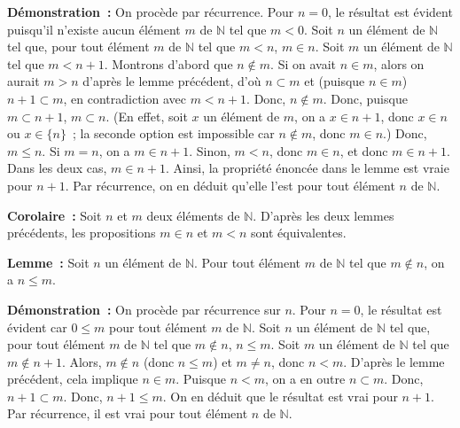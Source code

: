 \noindent\textbf{Démonstration :} 
    On procède par récurrence. 
    Pour $n=0$, le résultat est évident puisqu'il n'existe aucun élément $m$ de $\mathbb{N}$ tel que $m < 0$.
    Soit $n$ un élément de $\mathbb{N}$ tel que, pour tout élément $m$ de $\mathbb{N}$ tel que $m < n$, $m \in n$. 
    Soit $m$ un élément de $\mathbb{N}$ tel que $m < n+1$. 
    Montrons d'abord que $n \notin m$. 
    Si on avait $n \in m$, alors on aurait $m > n$ d'après le lemme précédent, d'où $n \subset m$ et (puisque $n \in m$) $n+1 \subset m$, en contradiction avec $m < n+1$. 
    Donc, $n \notin m$. 
    Donc, puisque $m \subset n+1$, $m \subset n$. 
    (En effet, soit $x$ un élément de $m$, on a $x \in n+1$, donc $x \in n$ ou $x \in \lbrace n \rbrace$ ; la seconde option est impossible car $n \notin m$, donc $m \in n$.)
    Donc, $m \leq n$. 
    Si $m = n$, on a $m \in n+1$. 
    Sinon, $m < n$, donc $m \in n$, et donc $m \in n+1$. 
    Dans les deux cas, $m \in n+1$. 
    Ainsi, la propriété énoncée dans le lemme est vraie pour $n+1$. 
    Par récurrence, on en déduit qu'elle l'est pour tout élément $n$ de $\mathbb{N}$.

   \done 

\medskip

\noindent\textbf{Corolaire :} 
    Soit $n$ et $m$ deux éléments de $\mathbb{N}$. 
    D'après les deux lemmes précédents, les propositions $m \in n$ et $m < n$ sont équivalentes.

\medskip

\noindent\textbf{Lemme :} 
    Soit $n$ un élément de $\mathbb{N}$. 
    Pour tout élément $m$ de $\mathbb{N}$ tel que $m \notin n$, on a $n \leq m$.

\medskip

\noindent\textbf{Démonstration :} 
    On procède par récurrence sur $n$. 
    Pour $n=0$, le résultat est évident car $0 \leq m$ pour tout élément $m$ de $\mathbb{N}$.
    Soit $n$ un élément de $\mathbb{N}$ tel que, pour tout élément $m$ de $\mathbb{N}$ tel que $m \notin n$, $n \leq m$. 
    Soit $m$ un élément de $\mathbb{N}$ tel que $m \notin n+1$. 
    Alors, $m \notin n$ (donc $n \leq m$) et $m \neq n$, donc $n < m$. 
    D'après le lemme précédent, cela implique $n \in m$. 
    Puisque $n < m$, on a en outre $n \subset m$. 
    Donc, $n+1 \subset m$. 
    Donc, $n+1 \leq m$. 
    On en déduit que le résultat est vrai pour $n+1$.
    Par récurrence, il est vrai pour tout élément $n$ de $\mathbb{N}$. 

   \done 

\medskip

